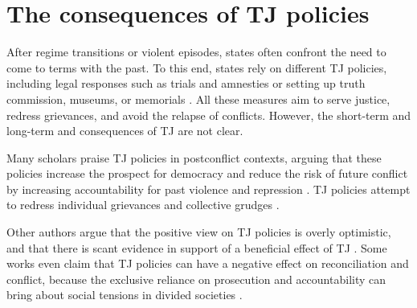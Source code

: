 \documentclass[12pt, notitlepage]{article}
\let\footnote=\endnote
\begin{document}

\section*{The consequences of TJ policies}

After regime transitions or violent episodes, states often confront the need to come to terms with the past.
To this end, states rely on different TJ policies, including legal responses such as trials and amnesties or setting up truth commission, museums, or memorials \citep{De-Brito:2001aa, Elster:2004aa, Balasco:2013aa}. All these measures aim to serve justice, redress grievances, and avoid the relapse of conflicts. However, the short-term and long-term and consequences of TJ are not clear.

Many scholars praise TJ policies in postconflict contexts, arguing that these policies increase the prospect for democracy \citep{Elster:2004aa, Sikkink:2007aa} and reduce the risk of future conflict by increasing accountability for past violence and repression \citep{Kim:2010aa, Meernik:2010aa}. TJ policies attempt to redress individual grievances and collective grudges \citep{Scharf:1997aa, Akhavan:1998aa, Hayner:2001aa}.

Other authors argue that the positive view on TJ policies is overly optimistic, and that there is scant evidence in support of a beneficial effect of TJ \citep{Mendeloff:2004aa, Thoms:2010aa, Daly:2011aa}.
Some works even claim that TJ policies can have a negative effect on reconciliation and conflict, because the exclusive reliance on prosecution and accountability can bring about social tensions in divided societies \citep{Goldsmith:2003aa, Snyder:2004aa}.
\end{document}
